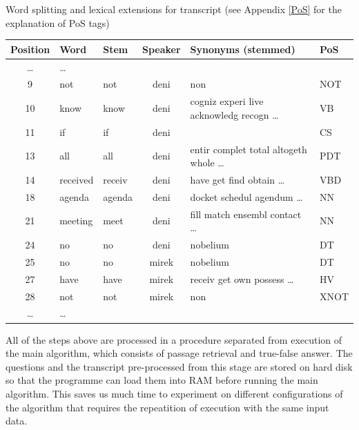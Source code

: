 \begin{center}
\begin{threeparttable}
\scriptsize
\caption{Word splitting and lexical extensions for transcript (see Appendix \ref{PoS} for the explanation of PoS tags)}
\label{word_splitting_transcript}
\begin{tabular}{|c|l|l|c|l|l|}
\hline  \bf{Position} & \bf{Word} & \bf{Stem} & \bf{Speaker} & \bf{Synonyms (stemmed)} &\bf{PoS} \\
\hline \ldots & \ldots & & & &\\
\hline 9 & not & not & deni & non & NOT\\
\hline 10 & know & know & deni & cogniz experi live acknowledg recogn \ldots & VB\\
\hline 11 & if & if & deni & & CS\\
\hline 13 & all & all & deni & entir complet total altogeth whole  \ldots & PDT\\
\hline 14 & received & receiv & deni & have get find obtain \ldots &VBD\\
\hline 18 & agenda & agenda & deni & docket schedul agendum \ldots & NN\\
\hline 21 & meeting & meet & deni & fill match ensembl contact \ldots & NN\\
\hline 24 & no & no & deni & nobelium & DT\\
\hline 25 & no & no & mirek & nobelium & DT\\
\hline 27 & have &have &mirek &  receiv get own possess \ldots &HV\\
\hline 28 & not &not &mirek & non&XNOT\\
\hline \ldots & \ldots & & & &\\
\hline 
\end{tabular}
\end{threeparttable}
\end{center}


\normalsize

All of the steps above are processed in a procedure separated from execution of the main algorithm, which consists of passage retrieval and true-false answer. The questions and the transcript pre-processed from this stage are stored on hard disk so that the programme can load them into RAM before running the main algorithm. This saves us much time to experiment on different configurations of the algorithm that requires the repeatition of execution with the same input data. 

